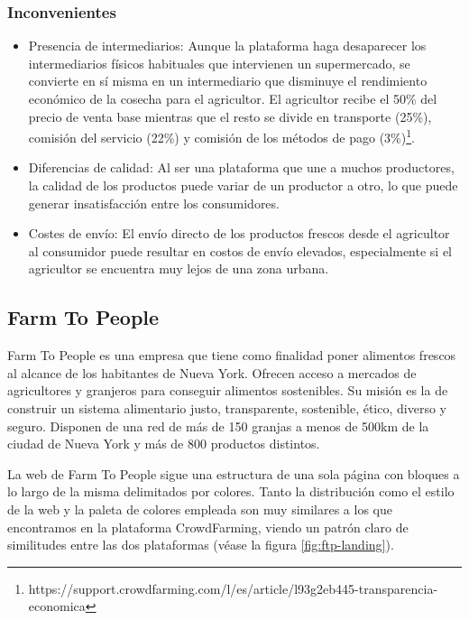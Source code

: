 \subsubsection{Inconvenientes}

\begin{itemize}

	\item Presencia de intermediarios: Aunque la plataforma haga desaparecer los intermediarios físicos habituales que intervienen un supermercado, se convierte en sí misma en un intermediario que disminuye el rendimiento económico de la cosecha para el agricultor. El agricultor recibe el 50\% del precio de venta base mientras que el resto se divide en transporte (25\%), comisión del servicio (22\%) y comisión de los métodos de pago (3\%)\footnote{https://support.crowdfarming.com/l/es/article/l93g2eb445-transparencia-economica}.

	\item Diferencias de calidad: Al ser una plataforma que une a muchos productores, la calidad de los productos puede variar de un productor a otro, lo que puede generar insatisfacción entre los consumidores.

	\item Costes de envío: El envío directo de los productos frescos desde el agricultor al consumidor puede resultar en costos de envío elevados, especialmente si el agricultor se encuentra muy lejos de una zona urbana.

\end{itemize}

\subsection{Farm To People}

Farm To People es una empresa que tiene como finalidad poner alimentos frescos al alcance de los habitantes de Nueva York. Ofrecen acceso a mercados de agricultores y granjeros para conseguir alimentos sostenibles. Su misión es la de construir un sistema alimentario justo, transparente, sostenible, ético, diverso y seguro. Disponen de una red de más de 150 granjas a menos de 500km de la ciudad de Nueva York y más de 800 productos distintos.

La web de Farm To People sigue una estructura de una sola página con bloques a lo largo de la misma delimitados por colores. Tanto la distribución como el estilo de la web y la paleta de colores empleada son muy similares a los que encontramos en la plataforma CrowdFarming, viendo un patrón claro de similitudes entre las dos plataformas (véase la figura \ref{fig:ftp-landing}).

